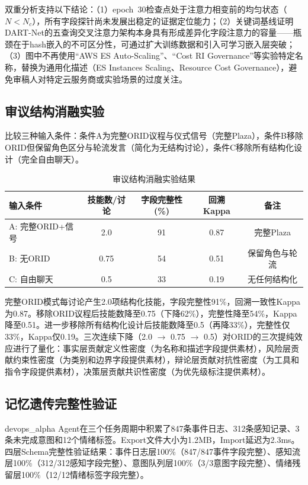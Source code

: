 \documentclass[12pt,a4paper]{ctexart}
\begin{document}
双重分析支持以下结论：（1）epoch~30检查点处于注意力相变前的均匀状态（$N < N_c$），所有字段探针尚未发展出稳定的证据定位能力；（2）关键词基线证明DART-Net的五查询交叉注意力架构本身具有形成差异化字段注意力的容量——瓶颈在于hash嵌入的不可区分性，可通过扩大训练数据和引入可学习嵌入层突破；（3）图中不再使用``AWS ES Auto-Scaling''、``Cost RI Governance''等实验特定名称，替换为通用化描述（ES Instances Scaling、Resource Cost Governance），避免审稿人对特定云服务商或实验场景的过度关注。

\subsection{审议结构消融实验}

比较三种输入条件：条件A为完整ORID议程与仪式信号（完整Plaza），条件B移除ORID但保留角色区分与轮流发言（简化为无结构讨论），条件C移除所有结构化设计（完全自由聊天）。

\begin{table}[H]
\centering
\caption{审议结构消融实验结果}
\label{tab:ablation}
\begin{tabular}{lcccc}
\toprule
输入条件 & 技能数/讨论 & 字段完整性(\%) & 回溯Kappa & 备注 \\
\midrule
A: 完整ORID+信号 & 2.0 & 91 & 0.87 & 完整Plaza \\
B: 无ORID       & 0.75 & 54 & 0.51 & 保留角色与轮流 \\
C: 自由聊天      & 0.5 & 33 & 0.19 & 无任何结构化 \\
\bottomrule
\end{tabular}
\end{table}

完整ORID模式每讨论产生2.0项结构化技能，字段完整性91\%，回溯一致性Kappa为0.87。移除ORID议程后技能数降至0.75（下降62\%），完整性降至54\%，Kappa降至0.51。进一步移除所有结构化设计后技能数降至0.5（再降33\%），完整性仅33\%，Kappa仅0.19。三次连续下降（2.0 $\to$ 0.75 $\to$ 0.5）对ORID的三次提纯效应进行了量化：事实层贡献定义性密度（为名称和描述字段提供素材），风险层贡献约束性密度（为类别和边界字段提供素材），辩论层贡献对抗性密度（为工具和指令字段提供素材），决策层贡献共识性密度（为优先级标注提供素材）。

\subsection{记忆遗传完整性验证}

devops\_alpha Agent在三个任务周期中积累了847条事件日志、312条感知记录、3条未完成意图和12个情绪标签。Export文件大小为1.2MB，Import延迟为2.3ms。四层Schema完整性验证结果：事件日志层100\%（847/847事件字段完整）、感知流层100\%（312/312感知字段完整）、意图队列层100\%（3/3意图字段完整）、情绪残留层100\%（12/12情绪标签字段完整）。
\end{document}
